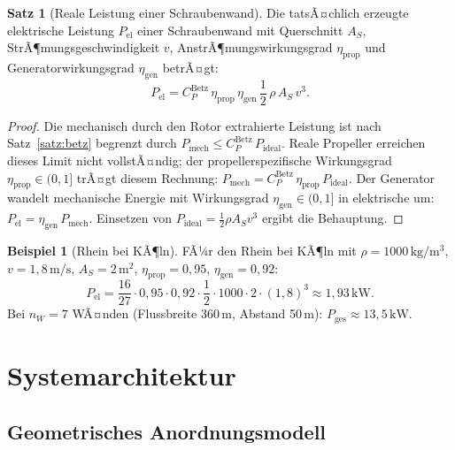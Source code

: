 ﻿\documentclass[a4paper,12pt]{article}
\theoremstyle{definition}
\newtheorem{beispiel}{Beispiel}
\newtheorem{satz}{Satz}
\begin{document}
\begin{satz}[Reale Leistung einer Schraubenwand]
\label{satz:realleistung}
Die tatsÃ¤chlich erzeugte elektrische Leistung $P_{\mathrm{el}}$ einer Schraubenwand
mit Querschnitt $A_S$, StrÃ¶mungsgeschwindigkeit $v$, AnstrÃ¶mungswirkungsgrad
$\eta_{\mathrm{prop}}$ und Generatorwirkungsgrad $\eta_{\mathrm{gen}}$ betrÃ¤gt:
\[
  P_{\mathrm{el}} = C_P^{\mathrm{Betz}}\,\eta_{\mathrm{prop}}\,\eta_{\mathrm{gen}}\,
                    \frac{1}{2}\,\rho\,A_S\,v^3.
\]
\end{satz}

\begin{proof}
Die mechanisch durch den Rotor extrahierte Leistung ist nach Satz~\ref{satz:betz}
begrenzt durch $P_{\mathrm{mech}} \leq C_P^{\mathrm{Betz}}\,P_{\mathrm{ideal}}$.
Reale Propeller erreichen dieses Limit nicht vollstÃ¤ndig; der propellerspezifische
Wirkungsgrad $\eta_{\mathrm{prop}} \in (0, 1]$ trÃ¤gt diesem Rechnung:
$P_{\mathrm{mech}} = C_P^{\mathrm{Betz}}\,\eta_{\mathrm{prop}}\,P_{\mathrm{ideal}}$.
Der Generator wandelt mechanische Energie mit Wirkungsgrad $\eta_{\mathrm{gen}} \in (0, 1]$
in elektrische um: $P_{\mathrm{el}} = \eta_{\mathrm{gen}}\,P_{\mathrm{mech}}$.
Einsetzen von $P_{\mathrm{ideal}} = \frac{1}{2}\rho A_S v^3$ ergibt die Behauptung.
\end{proof}

\begin{beispiel}[Rhein bei KÃ¶ln]
FÃ¼r den Rhein bei KÃ¶ln mit $\rho = 1000\,\mathrm{kg/m^3}$, $v = 1{,}8\,\mathrm{m/s}$,
$A_S = 2\,\mathrm{m^2}$, $\eta_{\mathrm{prop}} = 0{,}95$, $\eta_{\mathrm{gen}} = 0{,}92$:
\[
  P_{\mathrm{el}} = \frac{16}{27} \cdot 0{,}95 \cdot 0{,}92 \cdot \frac{1}{2}
                    \cdot 1000 \cdot 2 \cdot (1{,}8)^3
                  \approx 1{,}93\,\mathrm{kW}.
\]
Bei $n_W = 7$ WÃ¤nden (Flussbreite 360\,m, Abstand 50\,m):
$P_{\mathrm{ges}} \approx 13{,}5\,\mathrm{kW}$.
\end{beispiel}

\section{Systemarchitektur}

\subsection{Geometrisches Anordnungsmodell}
\end{document}
